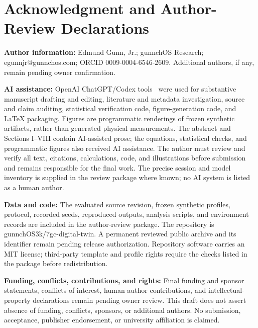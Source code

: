 \section*{Acknowledgment and Author-Review Declarations}
\textbf{Author information:} Edmund Gunn, Jr.; gunnchOS Research; egunnjr@gunnchos.com; ORCID 0009-0004-6546-2609. Additional authors, if any, remain pending owner confirmation.

\textbf{AI assistance:} OpenAI ChatGPT/Codex tools~\cite{openai_codex} were used for substantive manuscript drafting and editing, literature and metadata investigation, source and claim auditing, statistical verification code, figure-generation code, and LaTeX packaging. Figures are programmatic renderings of frozen synthetic artifacts, rather than generated physical measurements. The abstract and Sections I--VIII contain AI-assisted prose; the equations, statistical checks, and programmatic figures also received AI assistance. The author must review and verify all text, citations, calculations, code, and illustrations before submission and remains responsible for the final work. The precise session and model inventory is supplied in the review package where known; no AI system is listed as a human author.

\textbf{Data and code:} The evaluated source revision, frozen synthetic profiles, protocol, recorded seeds, reproduced outputs, analysis scripts, and environment records are included in the author-review package. The repository is gunnchOS3k/7gc-digital-twin. A permanent reviewed public archive and its identifier remain pending release authorization. Repository software carries an MIT license; third-party template and profile rights require the checks listed in the package before redistribution.

\textbf{Funding, conflicts, contributions, and rights:} Final funding and sponsor statements, conflicts of interest, human author contributions, and intellectual-property declarations remain pending owner review. This draft does not assert absence of funding, conflicts, sponsors, or additional authors. No submission, acceptance, publisher endorsement, or university affiliation is claimed.
